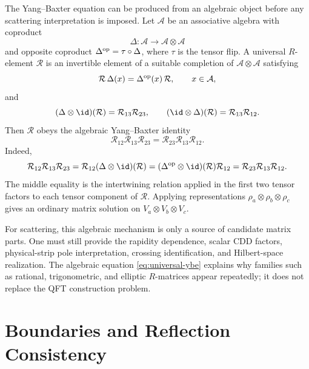 The Yang--Baxter equation can be produced from an algebraic object before any
scattering interpretation is imposed.  Let \(\mathcal A\) be an associative
algebra with coproduct
\[
  \Delta:\mathcal A\longrightarrow \mathcal A\otimes\mathcal A
\]
and opposite coproduct \(\Delta^{\rm op}=\tau\circ\Delta\), where \(\tau\) is
the tensor flip.  A universal \(R\)-element \(\mathcal R\) is an invertible
element of a suitable completion of \(\mathcal A\otimes\mathcal A\) satisfying
\[
  \mathcal R\,\Delta(x)=\Delta^{\rm op}(x)\,\mathcal R,
  \qquad x\in\mathcal A,
\]
and
\[
  (\Delta\otimes\id)(\mathcal R)=\mathcal R_{13}\mathcal R_{23},
  \qquad
  (\id\otimes\Delta)(\mathcal R)=\mathcal R_{13}\mathcal R_{12}.
\]
Then \(\mathcal R\) obeys the algebraic Yang--Baxter identity
\begin{equation}
\label{eq:universal-ybe}
  \mathcal R_{12}\mathcal R_{13}\mathcal R_{23}
  =
  \mathcal R_{23}\mathcal R_{13}\mathcal R_{12}.
\end{equation}
Indeed,
\[
  \mathcal R_{12}\mathcal R_{13}\mathcal R_{23}
  =
  \mathcal R_{12}(\Delta\otimes\id)(\mathcal R)
  =
  (\Delta^{\rm op}\otimes\id)(\mathcal R)\mathcal R_{12}
  =
  \mathcal R_{23}\mathcal R_{13}\mathcal R_{12}.
\]
The middle equality is the intertwining relation applied in the first two
tensor factors to each tensor component of \(\mathcal R\).  Applying
representations \(\rho_a\otimes\rho_b\otimes\rho_c\) gives an ordinary matrix
solution on \(V_a\otimes V_b\otimes V_c\).

For scattering, this algebraic mechanism is only a source of candidate matrix
parts.  One must still provide the rapidity dependence, scalar CDD factors,
physical-strip pole interpretation, crossing identification, and Hilbert-space
realization.  The algebraic equation \eqref{eq:universal-ybe} explains why
families such as rational, trigonometric, and elliptic \(R\)-matrices appear
repeatedly; it does not replace the QFT construction problem.

\section{Boundaries and Reflection Consistency}

